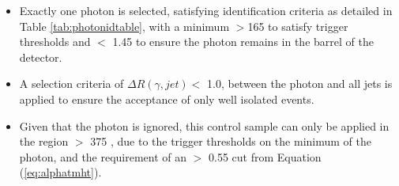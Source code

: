 \begin{itemize}
\begin{itemize}
\item Exactly one photon is selected, satisfying identification criteria as detailed in Table \ref{tab:photonidtable}, with a minimum \pt $> $165 \GeV to satisfy trigger thresholds and \abeta $<$ 1.45 to ensure the photon remains in the barrel of the detector.
\item A selection criteria of $\Delta R(\gamma,jet) <$ 1.0, between the photon and all jets is applied to ensure the acceptance of only well isolated \gpjets events. 
\item Given that the photon is ignored, this control sample can only be applied in the \theht region $>$ 375 \GeV, due to the trigger thresholds on the minimum \pt of the photon, and the \mht requirement of an \alphat $>$ 0.55 cut from Equation (\ref{eq:alphatmht}). 
\end{itemize}



\end{itemize}
